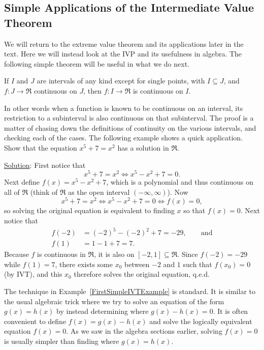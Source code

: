 \subsection{Simple Applications of the Intermediate Value Theorem}
We will return to the extreme value theorem and its applications
later in the text.  Here we will instead look at the IVP and 
its usefulness in algebra.  The following simple theorem 
will be useful in what we do next.

\begin{theorem} If $I$ and $J$ are intervals of any
kind except for single points,  with 
$I\subseteq J$, and $f:J\longrightarrow
\Re$ continuous on $J$, then $f:I\longrightarrow\Re$ is continuous
on $I$.\label{DumbContinuityOnSubintervalsTheorem}
\end{theorem}
In other words when a function is  known to be
continuous on an interval, its restriction to a subinterval
is also continuous on that subinterval.
The proof is a matter of chasing down the
definitions of continuity on the various intervals,
and checking each of the cases.  
The following example shows a quick application.
\bex Show that the equation $x^5+7=x^2$ has a solution in $\Re$.
\nopagebreak

\underline{Solution}: First notice that
$$x^5+7=x^2\iff x^5-x^2+7=0.$$
Next define $f(x)=x^5-x^2+7$, which is a polynomial and thus
continuous on all of $\Re$ (think of $\Re$ as the open
interval $(-\infty,\infty)$).  Now
$$x^5+7=x^2\iff x^5-x^2+7=0\iff f(x)=0,$$
so solving the original equation is equivalent to 
finding $x$ so that $f(x)=0$.
Next notice that 
\begin{align*}f(-2)&=(-2)^5-(-2)^2+7=-29,\qquad\text{and}\\
              f(1)&=1-1+7=7.\end{align*}
Because $f$ is continuous in $\Re$, it is also
on $[-2,1]\subseteq\Re$.  Since $f(-2)=-29$ while
$f(1)=7$, there  exists some $x_0$ between $-2$ and $1$
such that $f(x_0)=0$ (by IVT), and this $x_0$ therefore solves the
original equation, q.e.d.
\label{FirstSimpleIVTExample}\eex

The technique in Example~\ref{FirstSimpleIVTExample} is 
standard.  It is similar to the usual algebraic trick
where we try to solve an equation of the form
$g(x)=h(x)$ by instead determining where $g(x)-h(x)=0$.
It is often convenient to define $f(x)=g(x)-h(x)$
and solve the logically equivalent equation $f(x)=0$.
As we saw in the algebra sections earlier, solving $f(x)=0$ is usually
simpler than finding where $g(x)=h(x)$. 


